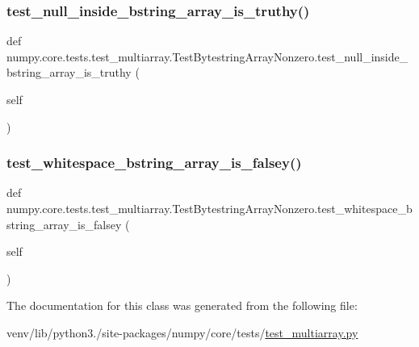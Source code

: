 \subsubsection{\texorpdfstring{test\+\_\+null\+\_\+inside\+\_\+bstring\+\_\+array\+\_\+is\+\_\+truthy()}{test\_null\_inside\_bstring\_array\_is\_truthy()}}
{\footnotesize\ttfamily def numpy.\+core.\+tests.\+test\+\_\+multiarray.\+Test\+Bytestring\+Array\+Nonzero.\+test\+\_\+null\+\_\+inside\+\_\+bstring\+\_\+array\+\_\+is\+\_\+truthy (\begin{DoxyParamCaption}\item[{}]{self }\end{DoxyParamCaption})}

\mbox{\label{classnumpy_1_1core_1_1tests_1_1test__multiarray_1_1TestBytestringArrayNonzero_a60282b0a389b40973d17303cbea89958}} 
\subsubsection{\texorpdfstring{test\+\_\+whitespace\+\_\+bstring\+\_\+array\+\_\+is\+\_\+falsey()}{test\_whitespace\_bstring\_array\_is\_falsey()}}
{\footnotesize\ttfamily def numpy.\+core.\+tests.\+test\+\_\+multiarray.\+Test\+Bytestring\+Array\+Nonzero.\+test\+\_\+whitespace\+\_\+bstring\+\_\+array\+\_\+is\+\_\+falsey (\begin{DoxyParamCaption}\item[{}]{self }\end{DoxyParamCaption})}



The documentation for this class was generated from the following file\+:\begin{DoxyCompactItemize}
\item 
venv/lib/python3./site-\/packages/numpy/core/tests/\hyperlink{core_2tests_2test__multiarray_8py}{test\+\_\+multiarray.\+py}\end{DoxyCompactItemize}
